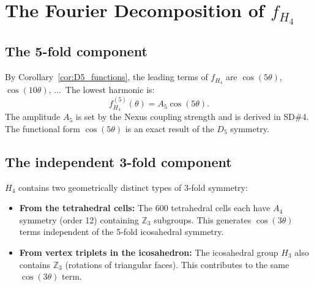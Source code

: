\documentclass[11pt,letterpaper]{article}
\begin{document}
\section{The Fourier Decomposition of $f_{H_4}$}

\subsection{The 5-fold component}

By Corollary~\ref{cor:D5_functions}, the leading terms of $f_{H_4}$
are $\cos(5\theta)$, $\cos(10\theta)$, $\ldots$\ The lowest harmonic
is:
\begin{equation}
f_{H_4}^{(5)}(\theta) = A_5\cos(5\theta).
\label{eq:f5}
\end{equation}
The amplitude $A_5$ is set by the Nexus coupling strength and is
derived in SD\#4.  The functional form $\cos(5\theta)$ is an
exact result of the $D_5$ symmetry.

\subsection{The independent 3-fold component}

$H_4$ contains two geometrically distinct types of 3-fold symmetry:
\begin{itemize}
\item \textbf{From the tetrahedral cells:} The 600 tetrahedral cells
  each have $A_4$ symmetry (order 12) containing $\mathbb{Z}_3$
  subgroups.  This generates $\cos(3\theta)$ terms independent of
  the 5-fold icosahedral symmetry.
\item \textbf{From vertex triplets in the icosahedron:} The
  icosahedral group $H_3$ also contains $\mathbb{Z}_3$ (rotations of
  triangular faces).  This contributes to the same $\cos(3\theta)$ term.
\end{itemize}
\end{document}
